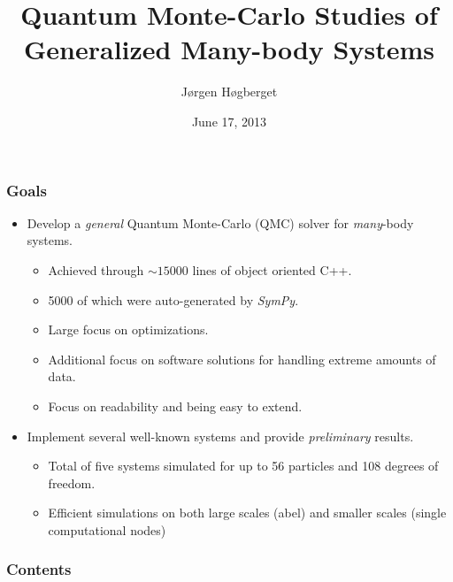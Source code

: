 \documentclass{beamer}
\title[Master Presentation]{Quantum Monte-Carlo Studies of Generalized Many-body Systems}
\author{Jørgen Høgberget}
\date{June 17, 2013}
\begin{document}
\begin{frame}
\titlepage
\end{frame}

\begin{frame}
 \frametitle{Goals}
  \begin{itemize}
   \item Develop a \emph{general} Quantum Monte-Carlo (QMC) solver for \emph{many}-body systems. 
   \begin{itemize}
      \pause \item Achieved through $\sim 15000$ lines of object oriented C++.
      \pause \item 5000 of which were auto-generated by \textit{SymPy}.
      \pause \item Large focus on optimizations. 
      \pause \item Additional focus on software solutions for handling extreme amounts of data.
      \pause \item Focus on readability and being easy to extend. 
   \end{itemize}
  \end{itemize}
  \begin{itemize}
   \pause \item Implement several well-known systems and provide \emph{preliminary} results.
   \begin{itemize}
      \pause \item Total of five systems simulated for up to 56 particles and 108 degrees of freedom.
      \pause \item Efficient simulations on both large scales (abel) and smaller scales (single computational nodes)
   \end{itemize}
  \end{itemize}
  
\end{frame}

\begin{frame}
 \frametitle{Contents}
 \tableofcontents[hideallsubsections]
\end{frame}


% 


\end{document}
